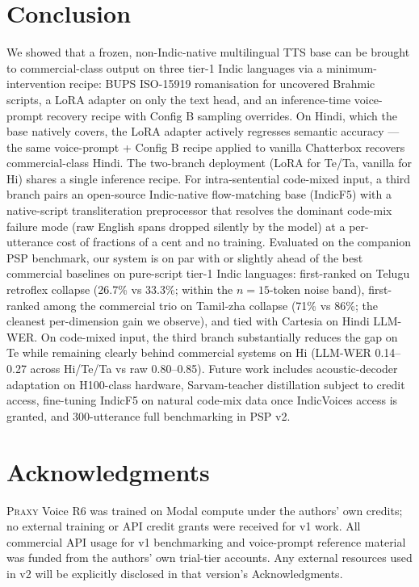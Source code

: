 \documentclass[conference,a4paper]{IEEEtran}
\newcommand{\psp}{\textsc{PSP}}
\newcommand{\praxy}{\textsc{Praxy}}
\newcommand{\bups}{\textsc{BUPS}}
\newcommand{\configb}{Config B}
\begin{document}
\section{Conclusion}
\label{sec:conclusion}
We showed that a frozen, non-Indic-native multilingual TTS base can be brought to commercial-class output on three tier-1 Indic languages via a minimum-intervention recipe: \bups{} ISO-15919 romanisation for uncovered Brahmic scripts, a LoRA adapter on only the text head, and an inference-time voice-prompt recovery recipe with \configb{} sampling overrides. On Hindi, which the base natively covers, the LoRA adapter actively regresses semantic accuracy --- the same voice-prompt + \configb{} recipe applied to vanilla Chatterbox recovers commercial-class Hindi. The two-branch deployment (LoRA for Te/Ta, vanilla for Hi) shares a single inference recipe. For intra-sentential code-mixed input, a third branch pairs an open-source Indic-native flow-matching base (IndicF5) with a native-script transliteration preprocessor that resolves the dominant code-mix failure mode (raw English spans dropped silently by the model) at a per-utterance cost of fractions of a cent and no training. Evaluated on the companion \psp{} benchmark, our system is on par with or slightly ahead of the best commercial baselines on pure-script tier-1 Indic languages: first-ranked on Telugu retroflex collapse (26.7\% vs 33.3\%; within the $n=15$-token noise band), first-ranked among the commercial trio on Tamil-zha collapse (71\% vs 86\%; the cleanest per-dimension gain we observe), and tied with Cartesia on Hindi LLM-WER. On code-mixed input, the third branch substantially reduces the gap on Te while remaining clearly behind commercial systems on Hi (LLM-WER 0.14--0.27 across Hi/Te/Ta vs raw 0.80--0.85). Future work includes acoustic-decoder adaptation on H100-class hardware, Sarvam-teacher distillation subject to credit access, fine-tuning IndicF5 on natural code-mix data once IndicVoices access is granted, and 300-utterance full benchmarking in \psp{} v2.

\section*{Acknowledgments}
\praxy{} Voice R6 was trained on Modal compute under the authors' own credits; no external training or API credit grants were received for v1 work. All commercial API usage for v1 benchmarking and voice-prompt reference material was funded from the authors' own trial-tier accounts. Any external resources used in v2 will be explicitly disclosed in that version's Acknowledgments.
\end{document}
